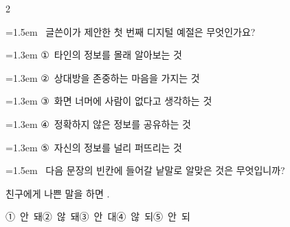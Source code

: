 \documentclass[11pt, a4paper]{article}
\begin{document}
\begin{multicols}{2}
\noindent\begin{minipage}{\columnwidth}
\vspace{2mm}
{\hangindent=1.5em  ~글쓴이가 제안한 첫 번째 디지털 예절은 무엇인가요?\par}

\vspace{0.5mm}
{\hangindent=1.3em  \noindent\hspace{0.3em}①~타인의 정보를 몰래 알아보는 것\par}
{\hangindent=1.3em  \noindent\hspace{0.3em}②~상대방을 존중하는 마음을 가지는 것\par}
{\hangindent=1.3em  \noindent\hspace{0.3em}③~화면 너머에 사람이 없다고 생각하는 것\par}
{\hangindent=1.3em  \noindent\hspace{0.3em}④~정확하지 않은 정보를 공유하는 것\par}
{\hangindent=1.3em  \noindent\hspace{0.3em}⑤~자신의 정보를 널리 퍼뜨리는 것\par}
\vspace{4mm}
\end{minipage}
\par

\noindent\begin{minipage}{\columnwidth}
\vspace{2mm}
{\hangindent=1.5em  ~다음 문장의 빈칸에 들어갈 낱말로 알맞은 것은 무엇입니까?\par}

\vspace{1mm}
\begin{boxibox}
친구에게 나쁜 말을 하면 \underline{\hspace{3cm}}. \\
\end{boxibox}
\vspace{1mm}

\vspace{0.5mm}
\noindent
\mbox{①~안 돼}\hspace{1em}\mbox{②~않 돼}\hspace{1em}\mbox{③~안 대}\hspace{1em}\mbox{④~않 되}\hspace{1em}\mbox{⑤~안 되}

\vspace{4mm}
\end{minipage}
\par


\end{multicols}
\end{document}
